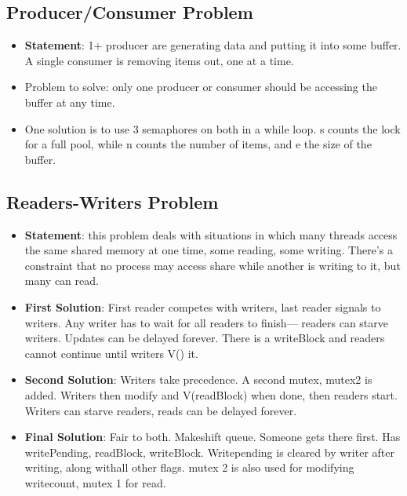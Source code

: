 \documentclass[fontsize=5pt]{scrartcl}
\begin{document}
\begin{multicols}{3}
      \subsection{Producer/Consumer Problem}
      \begin{itemize}
        \item \textbf{Statement}: 1+ producer are generating data and putting it into some buffer. A single consumer is removing items out, one at a time.
        \item Problem to solve: only one producer or consumer should be accessing the buffer at any time.
        \item One solution is to use 3 semaphores on both in a while loop. s counts the lock for a full pool, while n counts the number of items, and e the size of the buffer.
        
      \end{itemize}
      
      \subsection{Readers-Writers Problem}
        \begin{itemize}
          \item \textbf{Statement}: this problem deals with situations in which many threads access the same shared memory at one time, some reading, some writing. 
                There's a constraint that no process may access share while another is writing to it, but many can read.
          \item \textbf{First Solution}: First reader competes with writers, last reader signals to writers. Any writer has to wait for all readers to finish--- readers can starve writers.
                Updates can be delayed forever. There is a writeBlock and readers cannot continue until writers V() it.
          \item \textbf{Second Solution}: Writers take precedence. A second mutex, mutex2 is added. Writers then modify and V(readBlock) when done, then readers start. Writers can starve readers, reads can be delayed forever.
          \item \textbf{Final Solution}: Fair to both. Makeshift queue. Someone gets there first. Has writePending, readBlock, writeBlock. Writepending is cleared by writer after writing, along withall other flags. mutex 2 is also
                 used for modifying writecount, mutex 1 for read.  


\end{itemize}
\end{multicols}
\end{document}
